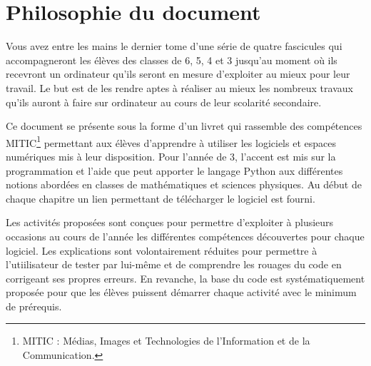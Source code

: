 \chapter*{Philosophie du document}



Vous avez entre les mains le dernier tome d'une série de quatre fascicules qui accompagneront les élèves des classes de 6, 5, 4 et 3 jusqu'au moment où ils recevront un ordinateur qu'ils seront en mesure d'exploiter au mieux pour leur travail. Le but est de les rendre aptes à réaliser au mieux les nombreux travaux qu'ils auront à faire sur ordinateur au cours de leur scolarité secondaire.

\vspace{18pt}

Ce document se présente sous la forme d'un livret qui rassemble des compétences MITIC\footnote{MITIC : Médias, Images et Technologies de l'Information et de la Communication.} permettant aux élèves d'apprendre à utiliser les logiciels et espaces numériques mis à leur disposition. Pour l'année de 3, l'accent est mis sur la programmation et l'aide que peut apporter le langage Python aux différentes notions abordées en classes de mathématiques et sciences physiques. Au début de chaque chapitre un lien permettant de télécharger le logiciel est fourni.

\vspace{18pt}

Les activités proposées sont conçues pour permettre d'exploiter à plusieurs occasions au cours de l'année les différentes compétences découvertes pour chaque logiciel. Les explications sont volontairement réduites pour permettre à l'utiilisateur de tester par lui-même et de comprendre les rouages du code en corrigeant ses propres erreurs. En revanche, la base du code est systématiquement proposée pour que les élèves puissent démarrer chaque activité avec le minimum de prérequis.


